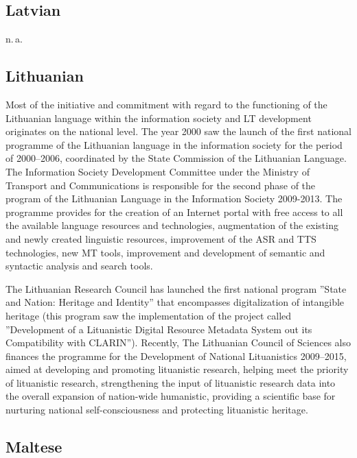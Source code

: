 \documentclass[10pt, plain]{../../metanetpaper}
\begin{document}
\begin{multicols}{2}
\begin{small}
\subsection*{Latvian}
\label{sec:latvian}

n.\,a.

\subsection*{Lithuanian}
\label{sec:lithuanian}

Most of the initiative and commitment with regard to the functioning of the Lithuanian language within the information society and LT development originates on the national level. The year 2000 saw the launch of the first national programme of the Lithuanian language in the information society for the period of 2000–2006, coordinated by the State Commission of the Lithuanian Language. The Information Society Development Committee under the Ministry of Transport and Communications is responsible for the second phase of the program of the Lithuanian Language in the Information Society 2009-2013. The programme provides for the creation of an Internet portal with free access to all the available language resources and technologies, augmentation of the existing and newly created linguistic resources, improvement of the ASR and TTS technologies, new MT tools, improvement and development of semantic and syntactic analysis and search tools.

The Lithuanian Research Council has launched the first national program ”State and Nation: Heritage and Identity” that encompasses digitalization of intangible heritage (this program saw the implementation of the project called ”Development of a Lituanistic Digital Resource Metadata System out its Compatibility with CLARIN”).  Recently, The Lithuanian Council of Sciences also finances the programme for the Development of National Lituanistics 2009–2015, aimed at developing and promoting lituanistic research, helping meet the priority of lituanistic research, strengthening the input of lituanistic research data into the overall expansion of nation-wide humanistic, providing a scientific base for nurturing national self-consciousness and protecting lituanistic heritage.

\subsection*{Maltese}
\label{sec:maltese}


\end{small}
\end{multicols}
\end{document}
